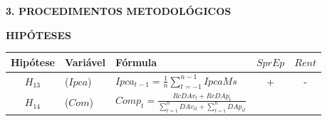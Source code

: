 \documentclass[ignorenonframetext,aspectratio=169,ignorenonframetext]{beamer}
\begin{document}
\begin{frame}{\textbf{3. PROCEDIMENTOS METODOLÓGICOS}}
\protect\hypertarget{procedimentos-metodoluxf3gicos-11}{}

\textbf{HIPÓTESES}

\begin{longtable}[]{@{}cllcc@{}}
\toprule
\begin{minipage}[b]{0.11\columnwidth}\centering
Hipótese\strut
\end{minipage} & \begin{minipage}[b]{0.15\columnwidth}\raggedright
Variável\strut
\end{minipage} & \begin{minipage}[b]{0.39\columnwidth}\raggedright
Fórmula\strut
\end{minipage} & \begin{minipage}[b]{0.11\columnwidth}\centering
\(SprEp\)\strut
\end{minipage} & \begin{minipage}[b]{0.11\columnwidth}\centering
\(Rent\)\strut
\end{minipage}\tabularnewline
\midrule
\endhead
\begin{minipage}[t]{0.11\columnwidth}\centering
\(H_{13}\)\strut
\end{minipage} & \begin{minipage}[t]{0.15\columnwidth}\raggedright
(\(Ipca\))\strut
\end{minipage} & \begin{minipage}[t]{0.39\columnwidth}\raggedright
\(Ipca_{t-1} = \frac{1}{n}\sum_{t=-1}^{n-1}IpcaMs\)\strut
\end{minipage} & \begin{minipage}[t]{0.11\columnwidth}\centering
+\strut
\end{minipage} & \begin{minipage}[t]{0.11\columnwidth}\centering
-\strut
\end{minipage}\tabularnewline
\begin{minipage}[t]{0.11\columnwidth}\centering
\(H_{14}\)\strut
\end{minipage} & \begin{minipage}[t]{0.15\columnwidth}\raggedright
(\(Com\))\strut
\end{minipage} & \begin{minipage}[t]{0.39\columnwidth}\raggedright
\(Comp_{t} = \frac{RcDAv_{t} + RcDAp_{t}}{\sum_{t=1}^{n}DAv_{it} + \sum_{t=1}^{n}DAp_{it}}\)\strut
\end{minipage} & \begin{minipage}[t]{0.11\columnwidth}\centering

\end{minipage}
\end{longtable}
\end{frame}
\end{document}
